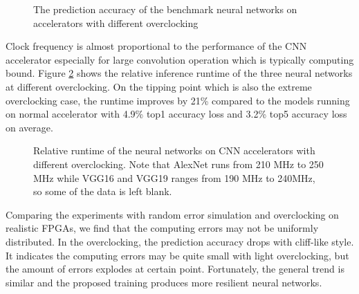 \begin{figure}
        \center
	\qquad
        \qquad
	\caption{The prediction accuracy of the benchmark neural networks on accelerators with different overclocking}
        \label{fig:overclock-accuracy}
\end{figure}

Clock frequency is almost proportional to the performance of the CNN accelerator 
especially for large convolution operation which is typically computing bound. 
Figure \ref{fig:overclocking-time} shows the relative inference runtime of the three neural networks at different 
overclocking. On the tipping point which is also the extreme overclocking case, 
the runtime improves by 21\% compared to the models running on normal accelerator with 
4.9\% top1 accuracy loss and 3.2\% top5 accuracy loss on average. 
\begin{figure}
        \caption{Relative runtime of the neural networks on CNN accelerators with different overclocking. Note that AlexNet runs from 210 MHz to 250 MHz while 
		VGG16 and VGG19 ranges from 190 MHz to 240MHz, so some of the data is left blank.}
        \label{fig:overclocking-time}
\end{figure}

Comparing the experiments with random error simulation and overclocking on realistic FPGAs, we
find that the computing errors may not be uniformly distributed. In the overclocking,  
the prediction accuracy drops with cliff-like style. It indicates the computing errors may 
be quite small with light overclocking, but the amount of errors explodes at certain point.
Fortunately, the general trend is similar and the proposed training produces more resilient 
neural networks. 


